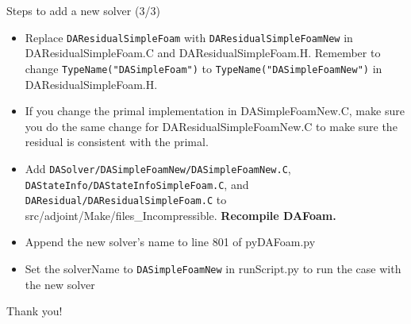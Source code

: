 \documentclass{bredelebeamer}
\begin{document}
\begin{frame}[fragile]{Steps to add a new solver (3/3)}
\begin{itemize}
  \setlength\itemsep{0.5em}
  \item Replace \texttt{DAResidualSimpleFoam} with \texttt{DAResidualSimpleFoamNew} in DAResidualSimpleFoam.C and DAResidualSimpleFoam.H. Remember to change \texttt{TypeName("DASimpleFoam")} to \texttt{TypeName("DASimpleFoamNew")} in DAResidualSimpleFoam.H.
 \item If you change the primal implementation in DASimpleFoamNew.C, make sure you do the same change for DAResidualSimpleFoamNew.C to make sure the residual is consistent with the primal.
 \item Add \texttt{DASolver/DASimpleFoamNew/DASimpleFoamNew.C}, \texttt{DAStateInfo/DAStateInfoSimpleFoam.C}, and \texttt{DAResidual/DAResidualSimpleFoam.C} to src/adjoint/Make/files\_Incompressible. \textbf{Recompile DAFoam.}
 \item Append the new solver's name to line 801 of pyDAFoam.py
 \item Set the solverName to \texttt{DASimpleFoamNew} in runScript.py to run the case with the new solver
\end{itemize}
\end{frame}

\begin{frame}[plain]{}
  \Huge \centering
  Thank you!
\end{frame}
\end{document}
